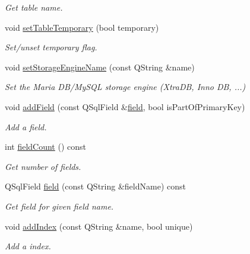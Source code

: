 \begin{DoxyCompactItemize}
\begin{DoxyCompactList}\small\item\em Get table name. \end{DoxyCompactList}\item 
void \hyperlink{classmdt_sql_schema_table_af6f32155aaaaa60c83f452f60268ee54}{set\-Table\-Temporary} (bool temporary)
\begin{DoxyCompactList}\small\item\em Set/unset temporary flag. \end{DoxyCompactList}\item 
void \hyperlink{classmdt_sql_schema_table_a175f4d150a816bd46bd1a8b3fccbe059}{set\-Storage\-Engine\-Name} (const Q\-String \&name)
\begin{DoxyCompactList}\small\item\em Set the Maria D\-B/\-My\-S\-Q\-L storage engine (Xtra\-D\-B, Inno D\-B, ...) \end{DoxyCompactList}\item 
void \hyperlink{classmdt_sql_schema_table_a199589fde3f06590ba9cd38b1885fa38}{add\-Field} (const Q\-Sql\-Field \&\hyperlink{classmdt_sql_schema_table_a06de6124f02171e7bf3ffa207cb8a878}{field}, bool is\-Part\-Of\-Primary\-Key)
\begin{DoxyCompactList}\small\item\em Add a field. \end{DoxyCompactList}\item 
int \hyperlink{classmdt_sql_schema_table_a24a9e8f260bc96f96219711981124d87}{field\-Count} () const 
\begin{DoxyCompactList}\small\item\em Get number of fields. \end{DoxyCompactList}\item 
Q\-Sql\-Field \hyperlink{classmdt_sql_schema_table_a06de6124f02171e7bf3ffa207cb8a878}{field} (const Q\-String \&field\-Name) const 
\begin{DoxyCompactList}\small\item\em Get field for given field name. \end{DoxyCompactList}\item 
void \hyperlink{classmdt_sql_schema_table_a55c4ff0c8d01bf794e84cf4828d2cb56}{add\-Index} (const Q\-String \&name, bool unique)
\begin{DoxyCompactList}\small\item\em Add a index. \end{DoxyCompactList}\item 

\end{DoxyCompactItemize}
